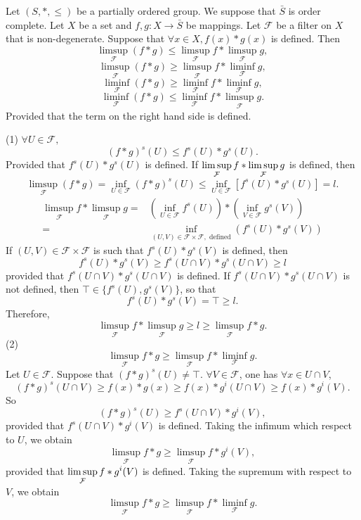 \begin{theoremenv}
    Let $(S,*,\le)$ be a partially ordered group. We suppose that $\bar{S}$ is order complete. Let $X$ be a set and 
    $f,g:X\longrightarrow \bar{S}$ be mappings. Let $\mathcal{F}$ be a filter on $X$ that is non-degenerate. Suppose that $\forall x\in X, f(x)*g(x)$ is defined. Then 
    $$\limsup_{\mathcal{F}}(f*g)\le \limsup_{\mathcal{F}}f*\limsup_{\mathcal{F}}g,$$
    $$\limsup_{\mathcal{F}}(f*g)\ge \limsup_{\mathcal{F}}f*\liminf_{\mathcal{F}}g,$$
    $$\liminf_{\mathcal{F}}(f*g)\ge \liminf_{\mathcal{F}}f*\liminf_{\mathcal{F}}g,$$
    $$\liminf_{\mathcal{F}}(f*g)\le \liminf_{\mathcal{F}}f*\limsup_{\mathcal{F}}g.$$
    Provided that the term on the right hand side is defined.

\end{theoremenv}
\begin{proofenv}
    \quad\newline
    (1) $\forall U\in\mathcal{F},$
    $$(f*g)^s(U)\le f^s(U)*g^s(U).$$
    Provided that $f^s(U)* g^s(U)$ is defined.
    If $\displaystyle \limsup_{\mathcal{F}}f*\limsup_{\mathcal{F}}g$ is defined, then 
    $$\limsup _{\mathcal{F}}(f*g)=\inf_{U\in \mathcal{F}}(f*g)^s(U)\le \inf_{U\in \mathcal{F}}\left[f^s(U)*g^s(U)\right]=l.$$
\begin{align*}
\limsup_{\mathcal{F}}f*\limsup_{\mathcal{F}}g=&\left(\inf_{U\in \mathcal{F}}f^s(U)\right)*\left(\inf_{V\in\mathcal{F}}g^s(V)\right)\\
=&\inf_{(U,V)\in \mathcal{F}\times\mathcal{F},\text{ defined}}\left(f^s(U)*g^s(V)\right)
\end{align*}
If $(U,V)\in \mathcal{F}\times\mathcal{F}$ is such that $f^s(U)*g^s(V)$ is defined, then 
$$f^s(U)* g^s(V)\ge f^s(U\cap V)*g^s(U\cap V)\ge l$$
provided that $f^s(U\cap V)*g^s(U\cap V)$ is defined.
If $f^s(U\cap V)*g^s(U\cap V)$ is not defined, then $\top\in\{f^s(U),g^s(V)\}$, so that 
$$f^s(U)*g^s(V)=\top \ge l.$$
Therefore, $$\limsup_{\mathcal{F}}f*\limsup_{\mathcal{F}}g\ge l\ge \limsup_{\mathcal{F}}f*g.$$
(2) $$\limsup_{\mathcal{F}}f*g\ge \limsup_\mathcal{F}f *\liminf_\mathcal{F}g.$$
Let $U\in\mathcal{F}$. Suppose that $\left(f*g\right)^s(U)\not=\top$. $\forall V\in \mathcal{F}$, one has $\forall x\in U\cap V$,
$$\left(f*g\right)^s(U\cap V)\ge f(x)*g(x)\ge f(x)*g^i(U\cap V)\ge f(x)*g^i(V).$$
So $$\left(f*g\right)^s(U)\ge f^s(U\cap V)*g^i(V),$$
provided that $f^s(U\cap V)*g^i(V)$ is defined. Taking the infimum which respect to $U$, we obtain
$$\limsup_{\mathcal{F}}f*g\ge \limsup_{\mathcal{F}}f*g^i(V),$$
provided that $\displaystyle \limsup_{\mathcal{F}}f*g^i(V)$ is defined. Taking the supremum with respect to $V$, we obtain
$$\limsup_{\mathcal{F}}f*g\ge \limsup_{\mathcal{F}}f*\liminf_{\mathcal{F}}g.$$
\end{proofenv}
